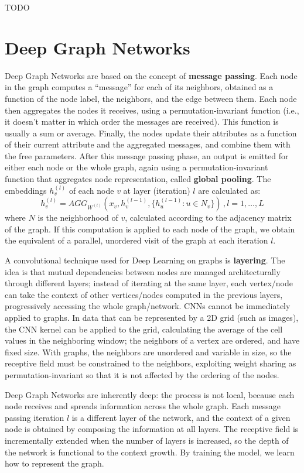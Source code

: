 TODO

\section{Deep Graph Networks}

Deep Graph Networks are based on the concept of \textbf{message passing}. Each node in the graph computes a ``message'' for each of its neighbors, obtained as a function of the node label, the neighbors, and the edge between them. Each node then aggregates the nodes it receives, using a permutation-invariant function (i.e., it doesn't matter in which order the messages are received). This function is usually a sum or average. Finally, the nodes update their attributes as a function of their current attribute and the aggregated messages, and combine them with the free parameters. After this message passing phase, an output is emitted for either each node or the whole graph, again using a permutation-invariant function that aggregates node representation, called \textbf{global pooling}. The embeddings $h_v^{(l)}$ of each node $v$ at layer (iteration) $l$ are calculated as:
\begin{equation*}
    h_v^{(l)} = AGG_{W^{(l)}}(x_v, h_v^{(l-1)}, \{h_u^{(l-1)} : u \in N_v\}) \,, l = 1, \dots , L
\end{equation*}
where $N$ is the neighborhood of $v$, calculated according to the adjacency matrix of the graph. If this computation is applied to each node of the graph, we obtain the equivalent of a parallel, unordered visit of the graph at each iteration $l$.

A convolutional technique used for Deep Learning on graphs is \textbf{layering}. The idea is that mutual dependencies between nodes are managed architecturally through different layers; instead of iterating at the same layer, each vertex/node can take the context of other vertices/nodes computed in the previous layers, progressively accessing the whole graph/network. CNNs cannot be immediately applied to graphs. In data that can be represented by a 2D grid (such as images), the CNN kernel can be applied to the grid, calculating the average of the cell values in the neighboring window; the neighbors of a vertex are ordered, and have fixed size. With graphs, the neighbors are unordered and variable in size, so the receptive field must be constrained to the neighbors, exploiting weight sharing as permutation-invariant so that it is not affected by the ordering of the nodes.

Deep Graph Networks are inherently deep: the process is not local, because each node receives and spreads information across the whole graph. Each message passing iteration $l$ is a different layer of the network, and the context of a given node is obtained by composing the information at all layers. The receptive field is incrementally extended when the number of layers is increased, so the depth of the network is functional to the context growth. By training the model, we learn how to represent the graph.


